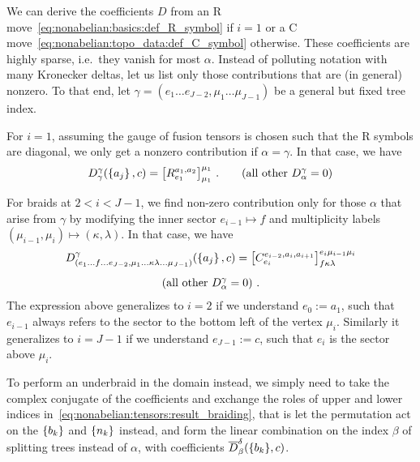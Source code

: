 We can derive the coefficients $D$ from an R move~\eqref{eq:nonabelian:basics:def_R_symbol} if $i=1$ or a C move~\eqref{eq:nonabelian:topo_data:def_C_symbol} otherwise.
%
These coefficients are highly sparse, i.e.~they vanish for most $\alpha$.
%
Instead of polluting notation with many Kronecker deltas, let us list only those contributions that are (in general) nonzero.
%
To that end, let $\gamma = (e_1\dots e_{J-2},\mu_1\dots \mu_{J-1})$ be a general but fixed tree index.

For $i=1$, assuming the gauge of fusion tensors is chosen such that the R symbols are diagonal, we only get a nonzero contribution if $\alpha = \gamma$.
%
In that case, we have 
\begin{equation}
    \label{eq:nonabelian:tensors:D_coefficients_for_R_move_braiding}
    D^\gamma_\gamma(\set{a_j},c)
    = \big[ R^{a_1,a_2}_{e_1} \big]^{\mu_1}_{\mu_1}
    ~.
    \qquad \text{(all other $D^\gamma_\alpha = 0$)}
\end{equation}

For braids at $2 < i < J - 1$, we find non-zero contribution only for those $\alpha$ that arise from $\gamma$ by modifying the inner sector $e_{i-1} \mapsto f$ and multiplicity labels $(\mu_{i-1}, \mu_i) \mapsto (\kappa, \lambda)$.
%
In that case, we have
\begin{gather}
    \label{eq:nonabelian:tensors:D_coefficients_for_C_move_braiding}
    \begin{gathered}
        D^\gamma_{(e_1\dots f \dots e_{J-2}, \mu_1\dots \kappa\lambda \dots \mu_{J-1})}(\set{a_j},c)
        = \big[ C^{e_{i-2},a_i,a_{i+1}}_{e_i}
        \big]^{e_i\mu_{i-1}\mu_i}_{f\kappa\lambda}
        \\[1ex]
        \text{(all other $D^\gamma_\alpha = 0$)}
        ~.
    \end{gathered}
\end{gather}
%
The expression above generalizes to $i=2$ if we understand $e_0 := a_1$, such that $e_{i-1}$ always refers to the sector to the bottom left of the vertex $\mu_i$.
%
Similarly it generalizes to $i = J-1$ if we understand $e_{J-1} := c$, such that $e_i$ is the sector above $\mu_i$.

To perform an underbraid in the domain instead, we simply need to take the complex conjugate of the coefficients and exchange the roles of upper and lower indices in~\eqref{eq:nonabelian:tensors:result_braiding}, that is let the permutation act on the $\set{b_k}$ and $\set{n_k}$ instead, and form the linear combination on the index $\beta$ of splitting trees instead of $\alpha$, with coefficients $\conj{D}^\delta_\beta(\set{b_k}, c)$.

